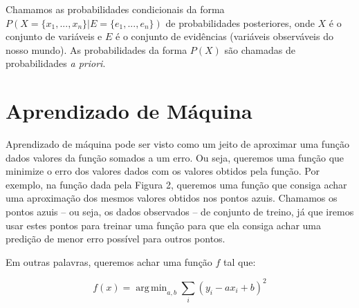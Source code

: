 \documentclass[a4paper,10pt]{article}
\DeclareMathOperator*{\argmin}{arg\,min}
\theoremstyle{plain}
\begin{document}
Chamamos as probabilidades condicionais da forma $P(X=\{x_1,...,x_n\} | E=\{e_1,...,e_n\})$ de
probabilidades posteriores, onde $X$ é o conjunto de variáveis e $E$ é o conjunto de evidências
(variáveis observáveis do nosso mundo). As probabilidades da forma $P(X)$ são chamadas de
probabilidades \textit{a priori}.

\section{Aprendizado de Máquina}

Aprendizado de máquina pode ser visto como um jeito de aproximar uma função dados valores da função
somados a um erro. Ou seja, queremos uma função que minimize o erro dos valores dados com os
valores obtidos pela função. Por exemplo, na função dada pela Figura 2, queremos uma função que
consiga achar uma aproximação dos mesmos valores obtidos nos pontos azuis. Chamamos os pontos
azuis -- ou seja, os dados observados -- de conjunto de treino, já que iremos usar estes pontos
para treinar uma função para que ela consiga achar uma predição de menor erro possível para outros
pontos.

Em outras palavras, queremos achar uma função $f$ tal que:

\begin{equation*}
  f(x) = \argmin_{a, b} \sum_i (y_i - ax_i + b)^2
\end{equation*}

\newpage
\end{document}

